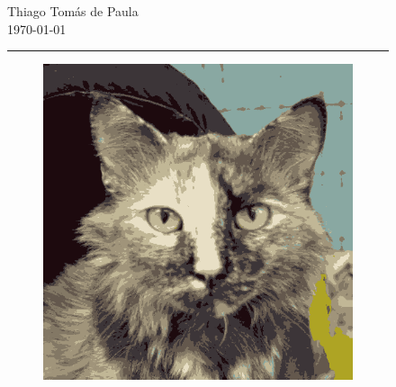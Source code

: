 \begin{figure}[htb]
\begin{subfigure}{.3\textwidth}
    \end{subfigure}
    \begin{minipage}{.3\textwidth}
        \centering
        \vspace{-1\textwidth}
        Thiago Tomás de Paula\\
        \today\\
        \rule{2cm}{.5pt}
    \end{minipage}
    \begin{subfigure}{.3\textwidth}
        \includegraphics[width=\linewidth]{../../python_code/plots/kmeans/cat-10/reconstruction-9.png}
    \end{subfigure}\\
    \vspace{1mm}
    \begin{subfigure}{.3\textwidth}

\end{subfigure}
\end{figure}
